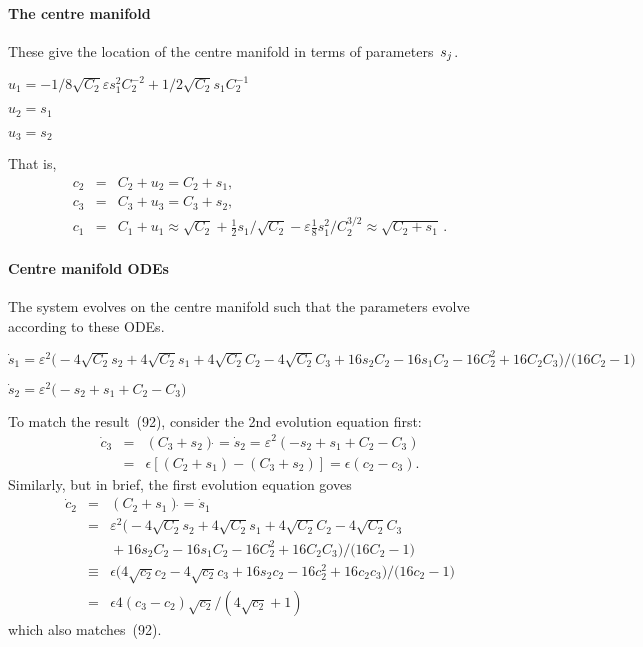 \documentclass[11pt,a5paper]{article}
\def\eps{\varepsilon}
\begin{document}
\(
\)
\paragraph{The centre manifold}
These give the location of the centre manifold in
terms of parameters~\(s\sb j\).
\(
\)\par
\(u_{1}=-1/8 \sqrt {C_2} \eps s_{1}^{2} C_2^{-2}+1/2 \sqrt {C_2} s_{1} C_2^{-1
}
\)\par
\(u_{2}=s_{1}
\)\par
\(u_{3}=s_{2}
\)\par
That is, 
\begin{eqnarray*}
c_2&=&C_2+u_2=C_2+s_1,\\
c_3&=&C_3+u_3=C_3+s_2,\\
c_1&=&C_1+u_1\approx\sqrt{C_2}+\tfrac12s_1/\sqrt{C_2}-\varepsilon\tfrac18s_1^2/C_2^{3/2}\approx \sqrt{C_2+s_1}\,.
\end{eqnarray*}




\paragraph{Centre manifold ODEs}
The system evolves on the centre manifold such
that the parameters evolve according to these ODEs.
\(
\)\par
\(\dot s_{1}=\eps^{2} \big(-4 \sqrt {C_2} s_{2}+4 \sqrt {C_2} s_{1}+4 
\sqrt {C_2} C_2-4 \sqrt {C_2} C_3+16 s_{2} C_2-16 s_{1} C_2-16 C_2^{2}+16 C_2 C_3
\big)/\big(16 C_2-1\big)
\)\par
\(\dot s_{2}=\eps^{2} \big(-s_{2}+s_{1}+C_2-C_3\big)
\)\par

To match the result~(92), consider the 2nd evolution equation first:
\begin{eqnarray*}
\dot c_3&=&(C_3+s_2)\dot{}=\dot s_2
=\varepsilon^2(-s_{2}+s_{1}+C_2-C_3)\\
&=&\epsilon[(C_2+s_1)-(C_3+s_2)]
=\epsilon(c_2-c_3).
\end{eqnarray*}
Similarly, but in brief, the first evolution equation goves
\begin{eqnarray*}
\dot c_2&=&(C_2+s_1)\dot{}=\dot s_1
\\&=&\eps^{2} \big(-4 \sqrt {C_2} s_{2}+4 \sqrt {C_2} s_{1}+4 
\sqrt {C_2} C_2-4 \sqrt {C_2} C_3
\\&&{}+16 s_{2} C_2-16 s_{1} C_2-16 C_2^{2}+16 C_2 C_3
\big)/\big(16 C_2-1\big)
\\&\equiv&\epsilon \big(4 
\sqrt {c_2} c_2-4 \sqrt {c_2} c_3+16 s_{2} c_2-16 c_2^{2}+16 c_2 c_3
\big)/\big(16 c_2-1\big)
\\&=&\epsilon4(c_3-c_2)\sqrt{c_2}/(4\sqrt{c_2}+1)
\end{eqnarray*}
which also matches~(92).
\end{document}
